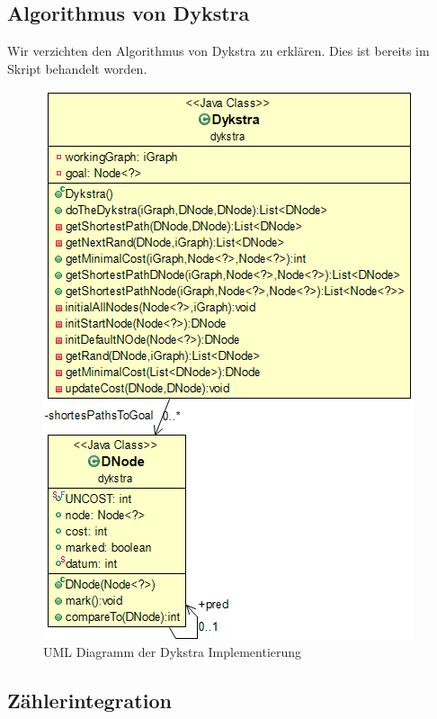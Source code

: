 \documentclass[
   draft=false
  ,paper=a4
  ,twoside=false
  ,fontsize=11pt
  ,headsepline
  ,DIV11
  ,parskip=full+
]{scrartcl} %
\begin{document}
\subsection{Algorithmus von Dykstra}
Wir verzichten den Algorithmus von Dykstra zu erklären. Dies ist bereits im Skript behandelt worden.
\begin{figure}[htp]
  	\centering
    \includegraphics[width=\textwidth]{./IMG/dykstra.png}
    \caption[shortone]{UML Diagramm der Dykstra Implementierung}
    \label{fig:plot}
\end{figure}


\subsection{Zählerintegration}
\end{document}
